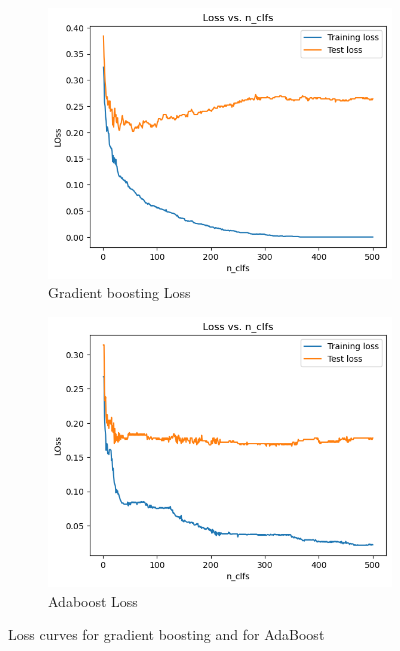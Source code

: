 \documentclass[
	12pt, %
]{fphw}
\begin{document}
\begin{enumerate}
	\begin{figure}[h!]
		\centering
		\begin{subfigure}[b]{0.45\textwidth}
		  \includegraphics[width=\textwidth]{GB_loss.png}
		  \caption{Gradient boosting Loss}
		  \label{fig:sub1}
		\end{subfigure}
		\hfill
		\begin{subfigure}[b]{0.45\textwidth}
		  \includegraphics[width=\textwidth]{AB_loss.png}
		  \caption{Adaboost Loss}
		  \label{fig:sub2}
		\end{subfigure}
		\caption{Loss curves for gradient boosting and for AdaBoost}
		\label{fig:images}
	  \end{figure}
\end{enumerate}
\end{document}
